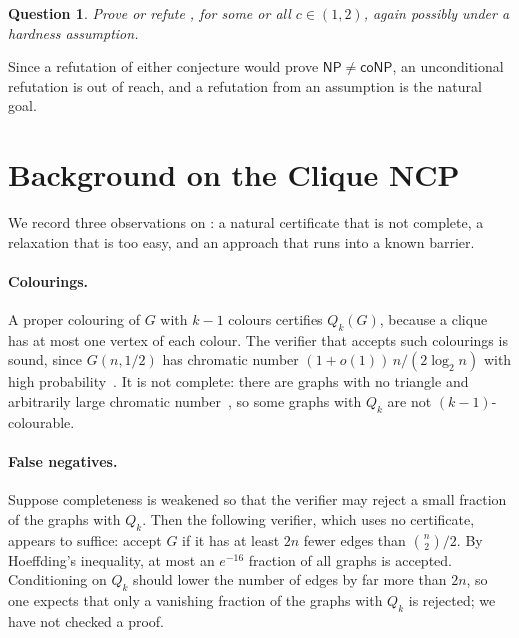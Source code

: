 \documentclass[11pt]{article}
\newtheorem{question}{Question}
\theoremstyle{remark}
\newcommand{\NP}{\mathsf{NP}}
\newcommand{\coNP}{\mathsf{coNP}}
\begin{document}
\begin{question}\label{q:clique}
Prove or refute , for some or all $c \in (1, 2)$, again possibly under a hardness assumption.
\end{question}

Since a refutation of either conjecture would prove $\NP \neq \coNP$, an unconditional refutation is out of reach, and a refutation from an assumption is the natural goal.

\section*{Background on the Clique NCP}

We record three observations on : a natural certificate that is not complete, a relaxation that is too easy, and an approach that runs into a known barrier.

\paragraph{Colourings.} A proper colouring of $G$ with $k - 1$ colours certifies $Q_k(G)$, because a clique has at most one vertex of each colour. The verifier that accepts such colourings is sound, since $G(n, 1/2)$ has chromatic number $(1 + o(1))\, n/(2 \log_2 n)$ with high probability~\cite{bollobas1988}. It is not complete: there are graphs with no triangle and arbitrarily large chromatic number~\cite{erdos1959}, so some graphs with $Q_k$ are not $(k-1)$-colourable.

\paragraph{False negatives.} Suppose completeness is weakened so that the verifier may reject a small fraction of the graphs with $Q_k$. Then the following verifier, which uses no certificate, appears to suffice: accept $G$ if it has at least $2n$ fewer edges than $\binom{n}{2}/2$. By Hoeffding's inequality, at most an $e^{-16}$ fraction of all graphs is accepted. Conditioning on $Q_k$ should lower the number of edges by far more than $2n$, so one expects that only a vanishing fraction of the graphs with $Q_k$ is rejected; we have not checked a proof.
\end{document}
